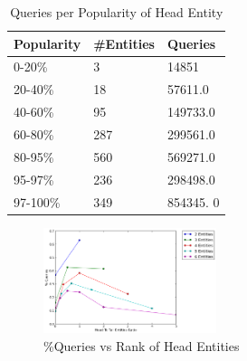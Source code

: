  
\begin{table}
\caption{Queries per Popularity of Head Entity}
\label{table:headEntQueryDist}
\centering
\begin{tabular}{|l|l|l|}
\hline
Popularity & \#Entities & Queries \\ \hline
0-20\% & 3 & 14851 \\ \hline
20-40\% & 18  & 57611.0 \\ \hline
40-60\% & 95 & 149733.0 \\ \hline
60-80\% & 287 & 299561.0 \\ \hline
80-95\% & 560 & 569271.0 \\ \hline
95-97\% & 236 & 298498.0 \\ \hline
97-100\% & 349 & 854345. 0  \\ \hline
\end{tabular}
\end{table}


\begin{figure}[t]
\label{img:headRankInTail}
\caption{\%Queries vs Rank of Head Entities}
  \centering
    \includegraphics[width = 0.45\textwidth]{images/entity-head-query-ratio-dist.png}
\end{figure}





